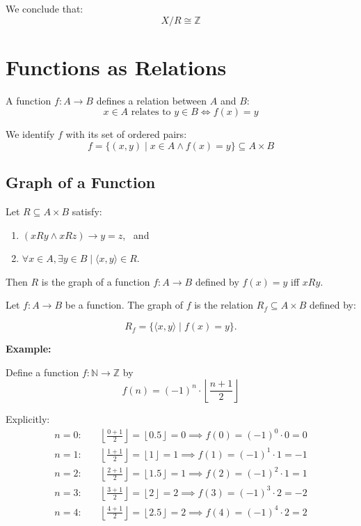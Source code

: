 \documentclass[12pt,a4paper,openany]{article}
\begin{document}
We conclude that:
   $$
   X/R \cong \mathbb{Z}
   $$


\section{Functions as Relations}

A function $f: A \to B$ defines a relation between $A$ and $B$:
\[
x \in A \text{ relates to } y \in B \iff f(x) = y
\]

We identify $f$ with its set of ordered pairs:
\[
f = \{(x, y) \mid x \in A \land f(x) = y\} \subseteq A \times B
\]

\subsection{Graph of a Function}

Let $R \subseteq A \times B$ satisfy:

\begin{enumerate}
\item $(xRy \land xRz) \to y = z$, \ and
\item $\forall x \in A, \exists y \in B \mid \langle x, y \rangle \in R$.
\end{enumerate}

Then $R$ is the graph of a function $f : A \to B$ defined by $f(x) = y$ iff $xRy$.

Let $f : A \to B$ be a function. The graph of $f$ is the relation $R_f \subseteq A \times B$ defined by:

\[
R_f = \{ \langle x, y \rangle \mid f(x) = y \}.
\]

\textbf{Example:}

Define a function $f : \mathbb{N} \to \mathbb{Z}$ by
\[
f(n) = (-1)^n \cdot \left\lfloor \frac{n+1}{2} \right\rfloor
\]

Explicitly:
\[
\begin{aligned}
n = 0: & \quad \left\lfloor \frac{0+1}{2} \right\rfloor = \left\lfloor 0.5 \right\rfloor = 0 \implies f(0) = (-1)^0 \cdot 0 = 0 \\
n = 1: & \quad \left\lfloor \frac{1+1}{2} \right\rfloor = \left\lfloor 1 \right\rfloor = 1 \implies f(1) = (-1)^1 \cdot 1 = -1 \\
n = 2: & \quad \left\lfloor \frac{2+1}{2} \right\rfloor = \left\lfloor 1.5 \right\rfloor = 1 \implies f(2) = (-1)^2 \cdot 1 = 1 \\
n = 3: & \quad \left\lfloor \frac{3+1}{2} \right\rfloor = \left\lfloor 2 \right\rfloor = 2 \implies f(3) = (-1)^3 \cdot 2 = -2 \\
n = 4: & \quad \left\lfloor \frac{4+1}{2} \right\rfloor = \left\lfloor 2.5 \right\rfloor = 2 \implies f(4) = (-1)^4 \cdot 2 = 2
\end{aligned}
\]
\end{document}
